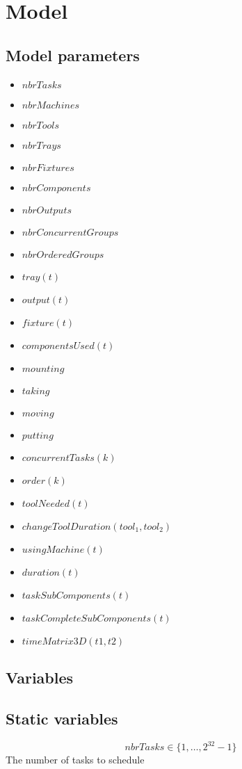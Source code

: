\documentclass[10pt,a4paper]{report}
\begin{document}
\section*{Model}
\subsection*{Model parameters}
\begin{itemize}
\item $nbrTasks$
\item $nbrMachines$
\item $nbrTools$
\item $nbrTrays$
\item $nbrFixtures$
\item $nbrComponents$
\item $nbrOutputs$
\item $nbrConcurrentGroups$
\item $nbrOrderedGroups$
\item $tray(t)$
\item $output(t)$
\item $fixture(t)$
\item $componentsUsed(t)$
\item $mounting$
\item $taking$
\item $moving$
\item $putting$
\item $concurrentTasks(k)$
\item $order(k)$
\item $toolNeeded(t)$
\item $changeToolDuration(tool_1,tool_2)$
\item $usingMachine(t)$
\item $duration(t)$
\item $taskSubComponents(t)$
\item $taskCompleteSubComponents(t)$
\item $timeMatrix3D(t1,t2)$
\end{itemize}


\subsection*{Variables}
\subsection*{Static variables}
\begin{equation}\label{eq:1}
nbrTasks \in \{1 , \ldots , 2^{32}-1\}
\end{equation}
The number of tasks to schedule
\end{document}
